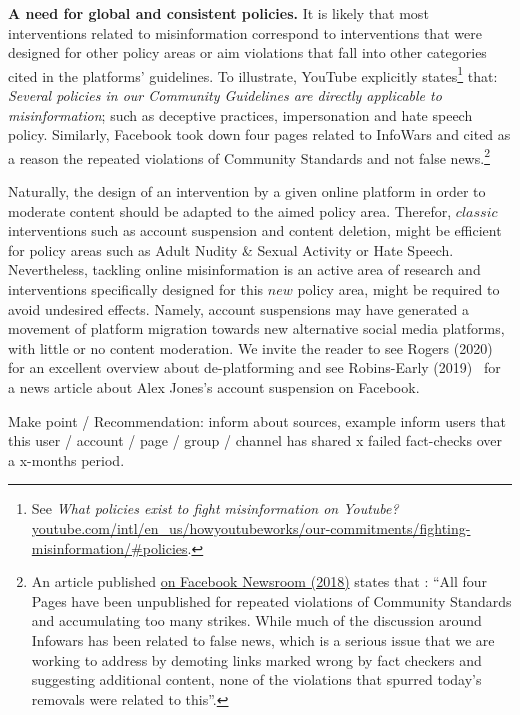 \documentclass{article}
\begin{document}
\smallskip

{\bf A need for global and consistent policies.} It is likely that most interventions related to misinformation correspond to interventions that were designed for other policy areas or aim violations that fall into other categories cited in the platforms' guidelines. To illustrate, YouTube explicitly states\footnote{See {\it What policies exist to fight misinformation on Youtube?} \href{https://www.youtube.com/intl/en\_us/howyoutubeworks/our-commitments/fighting-misinformation/\#policies}{youtube.com/intl/en\_us/howyoutubeworks/our-commitments/fighting-misinformation/\#policies}.} that: {\it Several policies in our Community Guidelines are directly applicable to misinformation}; such as deceptive practices, impersonation and hate speech policy. Similarly, Facebook took down four pages related to InfoWars and cited as a reason the repeated violations of Community Standards and not false news.\footnote{An article published \href{https://about.fb.com/news/2018/08/enforcing-our-community-standards/}{on Facebook Newsroom (2018)} states that : ``All four Pages have been unpublished for repeated violations of Community Standards and accumulating too many strikes. While much of the discussion around Infowars has been related to false news, which is a serious issue that we are working to address by demoting links marked wrong by fact checkers and suggesting additional content, none of the violations that spurred today’s removals were related to this''.}

Naturally, the design of an intervention by a given online platform in order to moderate content should be adapted to the aimed policy area. Therefor, $classic$ interventions such as account suspension and content deletion, might be efficient for policy areas such as Adult Nudity \& Sexual Activity or Hate Speech. Nevertheless, tackling online misinformation is an active area of research and interventions specifically designed for this $new$ policy area, might be required to avoid undesired effects. Namely, account suspensions may have generated a movement of platform migration towards new alternative social media platforms, with little or no content moderation. We invite the reader to see Rogers (2020)~\cite{rogers2020} for an excellent overview about de-platforming and see Robins-Early (2019)~\cite{huffpost} for a news article about Alex Jones's account suspension on Facebook.

{\color{brown} Make point / Recommendation: inform about sources, example inform users that this user / account / page / group / channel has shared x failed fact-checks over a x-months period.}
\end{document}
